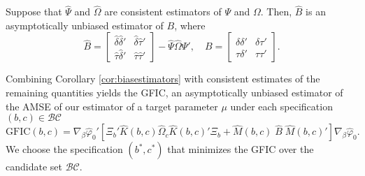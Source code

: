 \begin{cor}
\label{cor:biasestimators}
Suppose that $\widehat{\Psi}$ and $\widehat{\Omega}$ are consistent estimators of $\Psi$ and $\Omega$. Then, $\widehat{B}$ is an asymptotically unbiased estimator of $B$, where
\[
  \widehat{B} = \left[\begin{array}{cc}  \widehat{\delta} \widehat{\delta}'& \widehat{\delta} \widehat{\tau}'\\ \widehat{\tau} \widehat{\delta}'& \widehat{\tau} \widehat{\tau}'\end{array}\right] - \widehat{\Psi} \widehat{\Omega} \widehat{\Psi}', \quad B = 
\left[\begin{array}{cc}  \delta \delta'& \delta \tau'\\ \tau \delta'& \tau \tau'\end{array}\right].
\]
\end{cor}
Combining Corollary \ref{cor:biasestimators} with consistent estimates of the remaining quantities yields the GFIC, an asymptotically unbiased estimator of the AMSE of our estimator of a target parameter $\mu$ under each specification $(b,c)\in \mathcal{BC}$
\begin{equation}
\mbox{GFIC}(b,c) =\nabla_\beta \widehat{\varphi}_0' \left[\Xi_b' \widehat{K}(b,c)\widehat{\Omega}_c \widehat{K}(b,c)'\Xi_b +  \widehat{M}(b,c) \;\widehat{B} \; \widehat{M}(b,c)'\right]\nabla_\beta \widehat{\varphi}_0.
\label{eq:GFIC}
\end{equation}
We choose the specification $(b^*,c^*)$ that minimizes the GFIC over the candidate set $\mathcal{BC}$. 

